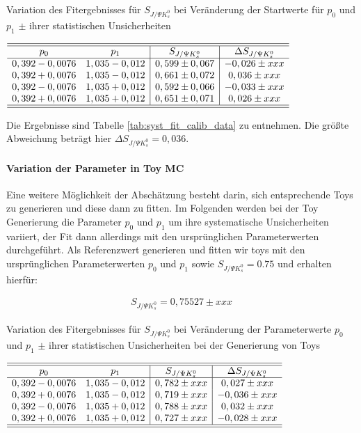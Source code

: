 \documentclass[a4paper]{scrbook}
\newcommand{\SJPsi}{S_{J/\Psi K_s^0}}
\begin{document}
\begin{table}[hptb]
\centering
\caption{Variation des Fitergebnisses für $\SJPsi$ bei Veränderung der Startwerte für $p_0$ und $p_1$ $\pm$ ihrer statistischen Unsicherheiten}
\label{tab:syst_fit_calib_data}
$\begin{array}{cc|c|c}
\hline\hline
p_0            & p_1           & \SJPsi          & \Delta\SJPsi   \\ \hline
0,392 - 0,0076 & 1,035 - 0,012 & 0,599 \pm 0,067 & -0,026 \pm xxx \\
0,392 + 0,0076 & 1,035 - 0,012 & 0,661 \pm 0,072 & 0,036 \pm xxx \\
0,392 - 0,0076 & 1,035 + 0,012 & 0,592 \pm 0,066 & -0,033 \pm xxx \\
0,392 + 0,0076 & 1,035 + 0,012 & 0,651 \pm 0,071 & 0,026 \pm xxx \\
\hline\hline
\end{array}$
\end{table}

Die Ergebnisse sind Tabelle \ref{tab:syst_fit_calib_data} zu entnehmen. Die größte Abweichung beträgt hier $\Delta\SJPsi = 0,036$.

\paragraph{Variation der Parameter in \gls{Toy MC}}
Eine weitere Möglichkeit der Abschätzung besteht darin, sich entsprechende Toys zu generieren und diese dann zu fitten. Im Folgenden werden bei der Toy Generierung die Parameter $p_0$ und $p_1$ um ihre systematische Unsicherheiten variiert, der Fit dann allerdings mit den ursprünglichen Parameterwerten durchgeführt. Als Referenzwert generieren und fitten wir toys mit den ursprünglichen Parameterwerten $p_0$ und $p_1$ sowie $\SJPsi = 0.75$ und erhalten hierfür:

\begin{align}
\SJPsi = 0,75527 \pm xxx
\end{align}

\begin{table}[hptb]
\centering
\caption{Variation des Fitergebnisses für $\SJPsi$ bei Veränderung der Parameterwerte $p_0$ und $p_1$ $\pm$ ihrer statistischen Unsicherheiten bei der Generierung von Toys}
\label{tab:syst_fit_calib_toys}
$\begin{array}{cc|c|c}
\hline\hline
p_0            & p_1           & \SJPsi          & \Delta\SJPsi   \\ \hline
0,392 - 0,0076 & 1,035 - 0,012 & 0,782 \pm xxx & 0,027 \pm xxx \\
0,392 + 0,0076 & 1,035 - 0,012 & 0,719 \pm xxx & -0,036 \pm xxx \\
0,392 - 0,0076 & 1,035 + 0,012 & 0,788 \pm xxx & 0,032 \pm xxx \\
0,392 + 0,0076 & 1,035 + 0,012 & 0,727 \pm xxx & -0,028 \pm xxx \\
\hline\hline
\end{array}$
\end{table}
\end{document}
